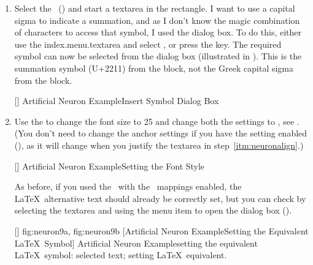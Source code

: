 \begin{enumerate}
[]
{}
{Artificial Neuron Example\dash Editing Text}

Now select all of the text on the left (,
 and ) and use the
 dialog box to change the horizontal
 parameter to . (Note
that you will not see any difference to the image in \FlowframTk.)

\item Select the \mathstool\ () and start a
\gls{textarea} in the rectangle.  I want to use a capital sigma to
indicate a summation, and as I don't know the magic combination of
characters to access that symbol, I used the
 dialog box. To do this, either use the
\gls{index.menu.textarea} and select ,
or press the  key. The required symbol can now be
selected from the  dialog box (illustrated in
). This is the summation symbol (U+2211) from
the  block, not the
Greek capital sigma from the
 block.

[]
{}
{Artificial Neuron Example\dash Insert Symbol Dialog Box}

\item Use the  to change the
font size to 25 and change both the  settings to
, see .
(You don't need to change the anchor settings if you have the
 setting enabled
(), as it will change when you justify the \gls{textarea}
in step~\ref{itm:neuronalign}.)

[]
{}
{Artificial Neuron Example\dash Setting the Font Style}

As before, if you used the \mathstool\ with the \mathsmode\
mappings enabled, the \LaTeX\ alternative text should already be
correctly set, but you can check by selecting the \gls{textarea} and using the
\menu{edit.textarea.edit} menu item to open the
 dialog box ().

[]
{
 {fig:neuron9a}{}{},
 {fig:neuron9b}{}{}
}
[Artificial Neuron Example\dash Setting the Equivalent \LaTeX\ Symbol]
{Artificial Neuron Example\dash setting the
equivalent \LaTeX\ symbol:
 selected text;
 setting \LaTeX\ equivalent.}


\end{enumerate}

